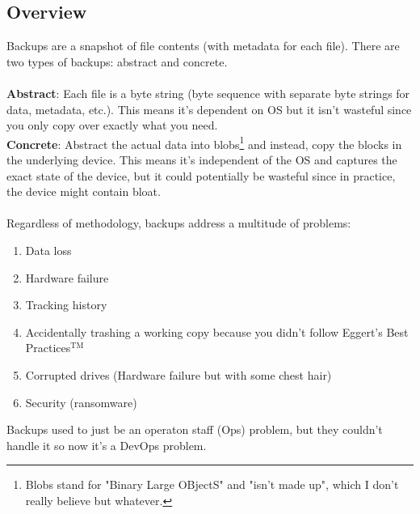 \documentclass[13pt]{article}
\begin{document}
\subsection{Overview}
Backups are a snapshot of file contents (with metadata for each file). There are two types of backups: abstract and concrete. \\ \\
\textbf{Abstract}: Each file is a byte string (byte sequence with separate byte strings for data, metadata, etc.). This means it's dependent on OS but it isn't wasteful since you only copy over exactly what you need. \\
\textbf{Concrete}: Abstract the actual data into blobs\footnote{Blobs stand for "Binary Large OBjectS" and "isn't made up", which I don't really believe but whatever.} and instead, copy the blocks in the underlying device. This means it's independent of the OS and captures the exact state of the device, but it could potentially be wasteful since in practice, the device might contain bloat. \\ \\
Regardless of methodology, backups address a multitude of problems:
\begin{enumerate}[label=(\arabic*)]
\item Data loss
\item Hardware failure
\item Tracking history
\item Accidentally trashing a working copy because you didn't follow Eggert's Best Practices$^{\text{TM}}$
\item Corrupted drives (Hardware failure but with some chest hair)
\item Security (ransomware)
\end{enumerate}
Backups used to just be an operaton staff (Ops) problem, but they couldn't handle it so now it's a DevOps problem.
\end{document}
